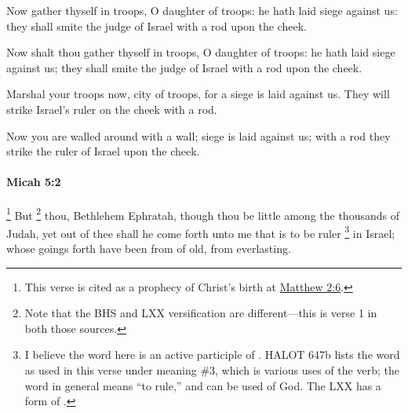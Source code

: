 			Now gather thyself in troops, O daughter of troops: he hath laid siege against us: they shall smite the judge of Israel with a rod upon the cheek.

			\begin{versebox}
					\item[BHS] 
					\item[LXX] 
					\item[ASV] Now shalt thou gather thyself in troops, O daughter of troops: he hath laid siege against us; they shall smite the judge of Israel with a rod upon the cheek.
					\item[NIV] Marshal your troops now, city of troops, for a siege is laid against us. They will strike Israel’s ruler on the cheek with a rod.
					\item[NRSV] Now you are walled around with a wall; siege is laid against us; with a rod they strike the ruler of Israel upon the cheek.
			\end{versebox}

		\paragraph{Micah 5:2} %
			\label{MICAH-5-2}

				\footnote{%
					This verse is cited as a prophecy of Christ's birth at \hyperref[MATTHEW-2-6]{Matthew 2:6}.
					}%
			But
				\footnote{%
					Note that the BHS and LXX versification are different---this is verse 1 in both those sources.
					}%
			thou, Bethlehem Ephratah, though thou be little among the thousands of Judah, yet out of thee shall he come forth unto me that is to be ruler%
				\footnote{%
					I believe the word here is an active participle of . HALOT 647b lists the word as used in this verse under meaning \#3, which is various uses of the verb; the word in general means ``to rule,'' and can be used of God. The LXX has a form of .
					}
			in Israel; whose goings forth have been from of old, from everlasting.

